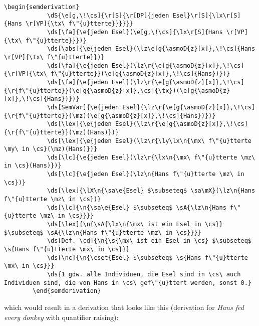 \documentclass[10pt, a4paper]{article}
\begin{document}
	\begin{lstlisting}[style=B]
		\begin{semderivation}
			\dS{\e[g,\!\cs]{\r[S]{\r[DP]{jeden Esel}\r[S]{\lx\r[S]{Hans \r[VP]{\tx\ f\"{u}tterte}}}}}}
			\ds[\fa]{\e{jeden Esel}(\e[g,\!\cs]{\lx\r[S]{Hans \r[VP]{\tx\ f\"{u}tterte}}})}
			\ds[\abs]{\e{jeden Esel}(\lz\e[g{\asmoD{z}[x]},\!\cs]{Hans \r[VP]{\tx\ f\"{u}tterte}})}
			\ds[\fa]{\e{jeden Esel}(\lz\r{\e[g{\asmoD{z}[x]},\!\cs]{\r[VP]{\tx\ f\"{u}tterte}}(\e[g{\asmoD{z}[x]},\!\cs]{Hans})})}
			\ds[\fa]{\e{jeden Esel}(\lz\r{\e[g{\asmoD{z}[x]},\!\cs]{\r{f\"{u}tterte}}(\e[g{\asmoD{z}[x]},\cs]{\tx})(\e[g{\asmoD{z}[x]},\!\cs]{Hans})})}
			\ds[SemVar]{\e{jeden Esel}(\lz\r{\e[g{\asmoD{z}[x]},\!\cs]{\r{f\"{u}tterte}}(\mz)(\e[g{\asmoD{z}[x]},\!\cs]{Hans})})}
			\ds[\lex]{\e{jeden Esel}(\lz\r{\e[g{\asmoD{z}[x]},\!\cs]{\r{f\"{u}tterte}}(\mz)(Hans)})}
			\ds[\lex]{\e{jeden Esel}(\lz\r{\ly\lx\n{\mx\ f\"{u}tterte \my\ in \cs}(\mz)(Hans)})}
			\ds[\lc]{\e{jeden Esel}(\lz\r{\lx\n{\mx\ f\"{u}tterte \mz\ in \cs}(Hans)})}
			\ds[\lc]{\e{jeden Esel}(\lz\n{Hans f\"{u}tterte \mz\ in \cs})}
			\ds[\lex]{\lX\n{\sa\e{Esel} $\subseteq$ \sa\mX}(\lz\n{Hans f\"{u}tterte \mz\ in \cs})}
			\ds[\lc]{\n{\sa\e{Esel} $\subseteq$ \sA{\lz\n{Hans f\"{u}tterte \mz\ in \cs}}}}
			\ds[\lex]{\n{\sA{\lx\n{\mx\ ist ein Esel in \cs}} $\subseteq$ \sA{\lz\n{Hans f\"{u}tterte \mz\ in \cs}}}}
			\ds[Def. \cd]{\n{\s{\mx\ ist ein Esel in \cs} $\subseteq$ \s{Hans f\"{u}tterte \mx\ in \cs}}}
			\ds[\nc]{\n{\cset{Esel} $\subseteq$ \s{Hans f\"{u}tterte \mx\ in \cs}}}
			\ds{1 gdw. alle Individuen, die Esel sind in \cs\ auch Individuen sind, die von Hans in \cs\ gef\"{u}ttert werden, sonst 0.}
		\end{semderivation}
	\end{lstlisting}
	which would result in a derivation that looks like this (derivation for \textit{Hans fed every donkey} with quantifier raising):
\end{document}
